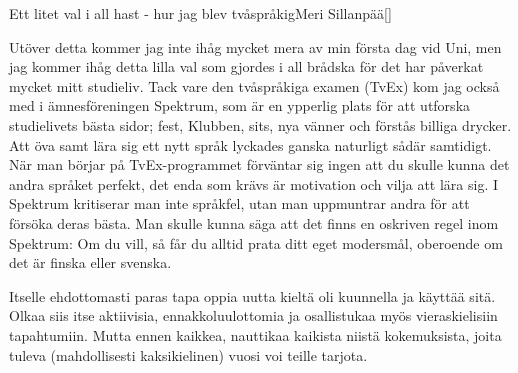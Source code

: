 \documentclass{spektraklet}
\begin{document}
\begin{artikel}{Ett litet val i all hast - hur jag blev tvåspråkig}{Meri Sillanpää}[]
\begin{twocolumns}
\columnbreak
Utöver detta kommer jag inte ihåg mycket mera av min första dag vid Uni, men jag kommer ihåg detta lilla val som gjordes i all brådska för det har påverkat mycket mitt studieliv. Tack vare den tvåspråkiga examen (TvEx) kom jag också med i ämnesföreningen Spektrum, som är en ypperlig plats för att utforska studielivets bästa sidor; fest, Klubben, sits, nya vänner och förstås billiga drycker. Att öva samt lära sig ett nytt språk lyckades ganska naturligt sådär samtidigt. När man börjar på TvEx-programmet förväntar sig ingen att du skulle kunna det andra språket perfekt, det enda som krävs är motivation och vilja att lära sig. I Spektrum kritiserar man inte språkfel, utan man uppmuntrar andra för att försöka deras bästa. Man skulle kunna säga att det finns en oskriven regel inom Spektrum: Om du vill, så får du alltid prata ditt eget modersmål, oberoende om det är finska eller svenska.

Itselle ehdottomasti paras tapa oppia uutta kieltä oli kuunnella ja käyttää sitä. Olkaa siis itse aktiivisia, ennakkoluulottomia ja osallistukaa myös vieraskielisiin tapahtumiin. Mutta ennen kaikkea, nauttikaa kaikista niistä kokemuksista, joita tuleva (mahdollisesti kaksikielinen) vuosi voi teille tarjota.

\end{twocolumns}
\end{artikel}

\newpage
\end{document}
